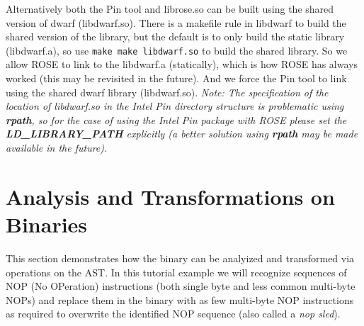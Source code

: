    Alternatively both the Pin tool and librose.so can be
built using the shared version of dwarf (libdwarf.so).
There is a makefile rule in libdwarf to build the shared
version of the library, but the default is to only build the
static library (libdwarf.a), so use {\tt make make libdwarf.so}
to build the shared library.  So we allow ROSE to link to
the libdwarf.a (statically), which is how ROSE has always
worked (this may be revisited in the future).  And we force 
the Pin tool to link using the shared dwarf library (libdwarf.so).
{\em Note: The specification of the location of libdwarf.so in the Intel Pin 
directory structure is problematic using {\bf rpath}, so for the case of 
using the Intel Pin package with ROSE please set the {\bf LD\_LIBRARY\_PATH}
explicitly (a better solution using {\bf rpath} may be made available in 
the future).}


 
\section{Analysis and Transformations on Binaries}

   This section demonstrates how the binary can be analyized and
transformed via operations on the AST. In this tutorial example we will
recognize sequences of NOP (No OPeration) instructions (both single byte
and less common multi-byte NOPs) and replace them in the binary with as 
few multi-byte NOP instructions as required to overwrite the identified
NOP sequence (also called a {\em nop sled}).


